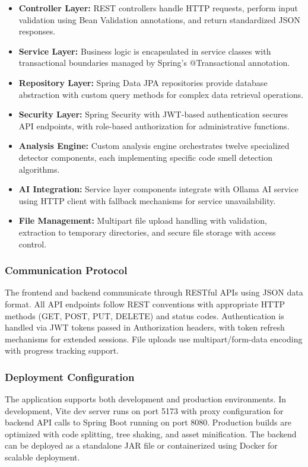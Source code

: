 \documentclass[12pt,a4paper]{article}
\begin{document}
    \begin{itemize}[leftmargin=0.5in]
        \item \textbf{Controller Layer:} REST controllers handle HTTP requests, perform input validation using Bean Validation annotations, and return standardized JSON responses.
        \item \textbf{Service Layer:} Business logic is encapsulated in service classes with transactional boundaries managed by Spring's @Transactional annotation.
        \item \textbf{Repository Layer:} Spring Data JPA repositories provide database abstraction with custom query methods for complex data retrieval operations.
        \item \textbf{Security Layer:} Spring Security with JWT-based authentication secures API endpoints, with role-based authorization for administrative functions.
        \item \textbf{Analysis Engine:} Custom analysis engine orchestrates twelve specialized detector components, each implementing specific code smell detection algorithms.
        \item \textbf{AI Integration:} Service layer components integrate with Ollama AI service using HTTP client with fallback mechanisms for service unavailability.
        \item \textbf{File Management:} Multipart file upload handling with validation, extraction to temporary directories, and secure file storage with access control.
    \end{itemize}

    \subsubsection{Communication Protocol}

    The frontend and backend communicate through RESTful APIs using JSON data format. All API endpoints follow REST conventions with appropriate HTTP methods (GET, POST, PUT, DELETE) and status codes. Authentication is handled via JWT tokens passed in Authorization headers, with token refresh mechanisms for extended sessions. File uploads use multipart/form-data encoding with progress tracking support.

    \subsubsection{Deployment Configuration}

    The application supports both development and production environments. In development, Vite dev server runs on port 5173 with proxy configuration for backend API calls to Spring Boot running on port 8080. Production builds are optimized with code splitting, tree shaking, and asset minification. The backend can be deployed as a standalone JAR file or containerized using Docker for scalable deployment.
\end{document}
